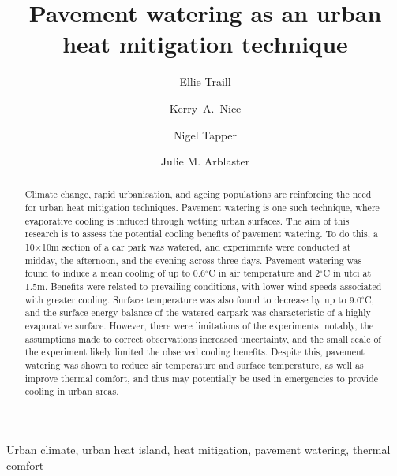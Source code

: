 \documentclass[final,3p,times,authoryear]{elsarticle}
\begin{document}
\title{Pavement watering as an urban heat mitigation technique}

\author[monash]{Ellie Traill}
\author[melb]{Kerry~A.~Nice}

\author[monash]{Nigel Tapper}
\author[arcmonash,arccoe]{Julie M. Arblaster}

\address[melb]{Transport, Health, and Urban Systems Research Lab, Faculty of Architecture, Building and Planning, University of Melbourne, VIC, Australia.}
\address[monash]{School of Earth, Atmosphere and Environment, Monash University, Clayton, VIC 3800, Australia.}
\address[arcmonash]{ARC Centre of Excellence for Climate Extremes, Monash University, Melbourne, VIC, Australia.}
\address[arccoe]{Australian Research Council Centre of Excellence for Climate Extremes.}




\begin{abstract}

Climate change, rapid urbanisation, and ageing populations are reinforcing the need for urban heat mitigation techniques. Pavement watering is one such technique, where evaporative cooling is induced through wetting urban surfaces. The aim of this research is to assess the potential cooling benefits of pavement watering. To do this, a 10$\times$10m section of a car park was watered, and experiments were conducted at midday, the afternoon, and the evening across three days. Pavement watering was found to induce a mean cooling of up to 0.6$^{\circ}$C in air temperature and 2$^{\circ}$C in \gls{utci} at 1.5m. Benefits were related to prevailing conditions, with lower wind speeds associated with greater cooling. Surface temperature was also found to decrease by up to 9.0$^{\circ}$C, and the surface energy balance of the watered carpark was characteristic of a highly evaporative surface. However, there were limitations of the experiments; notably, the assumptions made to correct observations increased uncertainty, and the small scale of the experiment likely limited the observed cooling benefits. Despite this, pavement watering was shown to reduce air temperature and surface temperature, as well as improve thermal comfort, and thus may potentially be used in emergencies to provide cooling in urban areas.

\end{abstract}

\begin{keyword}
Urban climate\sep
urban heat island\sep 
heat mitigation\sep 
pavement watering\sep 
thermal comfort
\end{keyword}
\end{document}

